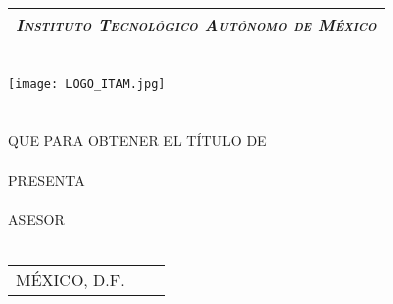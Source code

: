 \thispagestyle{empty}
\begin{titlepage}

	\begin{center}
	\vspace{70pt}
		\begin{tabular}{c}
			\Large \emph{\textsc{Instituto Tecnológico Autónomo de México}}\\
			\hline
		\end{tabular}\\
		\vspace{25pt}
		\texttt{[image: LOGO\_ITAM.jpg]}\\
		\vspace{25pt}
		{\large \thetitle}\\
		\vspace{5pt}
		\vspace{20 pt}
		{\Large \thethesis } \\
		\vspace{5pt}
		QUE PARA OBTENER EL TÍTULO DE \\
		\vspace{5pt}
		{\Large \textsc{\thedegree}} \\
		\vspace{5pt}
		PRESENTA \\
		\vspace{5pt}
		{\Large \textsc{\theauthor}} \\
		\vfill
		ASESOR \\
		{\Large \textsc{\theadvisor}} \\
		\vspace{5pt}
		\begin{tabular}{lcr}
			\textsc{MÉXICO, D.F.} & \hspace{60pt} & \textsc{\theyear}
		\end{tabular}
	\end{center}
\end{titlepage}